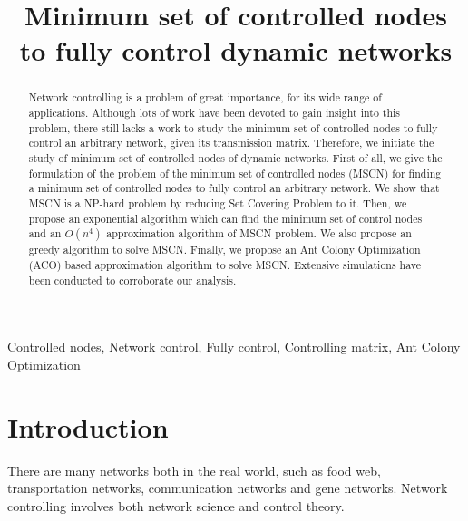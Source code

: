 \documentclass[10pt, conference, letterpaper]{IEEEtran}
\begin{document}


\title{Minimum set of controlled nodes to fully control dynamic networks}

%

\maketitle


\begin{abstract}
Network controlling is a problem of great importance, for its wide range of applications. Although lots of work have been devoted to gain insight into this problem, there still lacks a work to study the minimum set of controlled nodes to
fully control an arbitrary network, given its transmission matrix. Therefore, we
initiate the study of minimum set of controlled nodes of dynamic networks. First of all,
we give the formulation of the problem of the minimum set of controlled nodes (MSCN) for
finding a minimum set of controlled nodes to fully control an arbitrary network. We show that MSCN is a NP-hard problem by reducing Set Covering Problem to it. Then, we propose an exponential algorithm which can
find the minimum set of control nodes and an $O(n^4)$ approximation algorithm of MSCN problem. We also propose an greedy algorithm to solve MSCN. Finally, we propose an Ant Colony Optimization (ACO) based approximation algorithm to solve MSCN. Extensive simulations have been conducted to corroborate our analysis.
\end{abstract}


\begin{IEEEkeywords}
Controlled nodes, Network control, Fully control, Controlling matrix, Ant Colony Optimization
\end{IEEEkeywords}

\section{Introduction}
There are many networks both in the real world, such
as food web, transportation networks, communication networks and gene networks.
Network controlling involves both network science and control theory.
\end{document}
